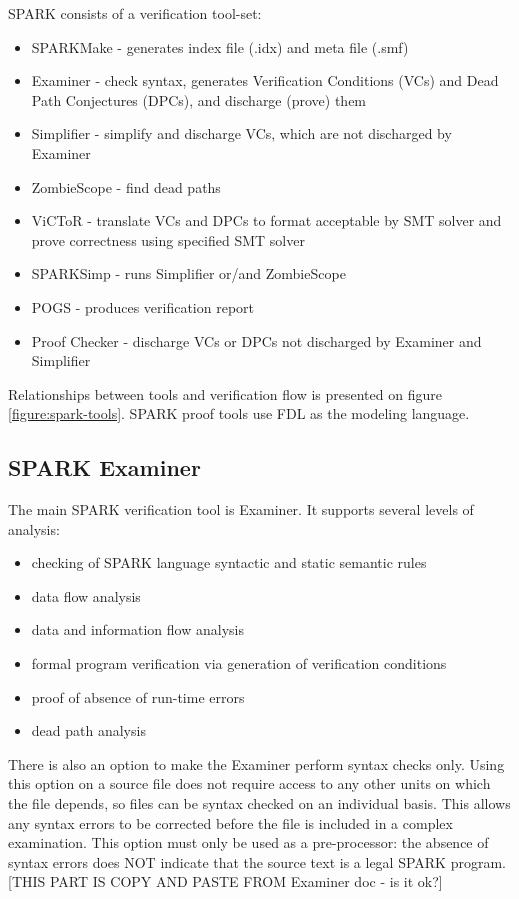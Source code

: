 SPARK consists of a verification tool-set:
\begin{itemize}
	\item SPARKMake - generates index file (.idx) and meta file (.smf)
	\item Examiner - check syntax, generates Verification Conditions (VCs) and Dead Path Conjectures (DPCs), and discharge (prove) them
	\item Simplifier - simplify and discharge VCs, which are not discharged by Examiner
	\item ZombieScope - find dead paths
	\item ViCToR - translate VCs and DPCs to format acceptable by SMT solver and prove correctness using specified SMT solver
	\item SPARKSimp - runs Simplifier or/and ZombieScope
	\item POGS - produces verification report
	\item Proof Checker - discharge VCs or DPCs not discharged by Examiner and Simplifier
\end{itemize}

Relationships between tools and verification flow is presented on figure \ref{figure:spark-tools}. SPARK proof tools use FDL as the modeling language. 


\subsection{SPARK Examiner}
\label{verification:examiner}

The main SPARK verification tool is Examiner. It supports several levels of analysis:
\begin{itemize}
	\item checking of SPARK language syntactic and static semantic rules
	\item data flow analysis
	\item data and information flow analysis
	\item formal program verification via generation of verification conditions
	\item proof of absence of run-time errors
	\item dead path analysis
\end{itemize}

There is also an option to make the Examiner perform syntax checks only. Using this option on a source file does not require access to any other units on which the file depends, so files can be syntax checked on an individual basis. This allows any syntax errors to be corrected before the file is included in a complex examination. This option must only be used as a pre-processor: the absence of syntax errors does NOT indicate that the source text is a legal SPARK program. \cite{Examiner:Online} [THIS PART IS COPY AND PASTE FROM Examiner doc - is it ok?]

